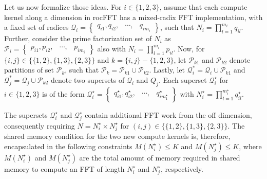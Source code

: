 \documentclass[11pt, onecolumn, journal,compsoc]{IEEEtran}
\theoremstyle{problemstyle}
\begin{document}
Let us now formalize those ideas. For $i \in \{1,2,3\}$, assume that each compute kernel along a dimension in rocFFT has a mixed-radix FFT implementation, with a fixed set of radices $\mathcal{Q}_i=\begin{Bmatrix} q_{i1}, q_{i2}, & \cdots, & q_{im_i} \end{Bmatrix}$, such that $N_i = \prod_{l=1}^{m_i} q_{il}$. Further, consider the prime factorization set of $N_i$ as $\mathcal{P}_i=\begin{Bmatrix} p_{i1}, p_{i2}, & \cdots, & p_{im_i} \end{Bmatrix}$ also with $N_i = \prod_{l=1}^{m_i} p_{il}$. Now, for $\{i,j\} \in \bigl \{ \{1,2\}, \{1,3\}, \{2,3\} \bigr \}$ and $k = \{i,j\} - \{1,2,3\}$, let $\mathcal{P}_{k1}$ and $\mathcal{P}_{k2}$ denote partitions of set $\mathcal{P}_k$, such that $\mathcal{P}_k = \mathcal{P}_{k1} \cup \mathcal{P}_{k2}$. Lastly, let $\mathcal{Q}_i^* = \mathcal{Q}_i \cup \mathcal{P}_{k1}$ and $\mathcal{Q}_j^* = \mathcal{Q}_j \cup \mathcal{P}_{k2}$ denote two supersets of $\mathcal{Q}_i$ and $Q_j$. Each superset $\mathcal{Q}_i^\star$ for $i \in \{1,2,3\}$ is of the form $\mathcal{Q}^{\star}_i=\begin{Bmatrix} q_{i1}^{\star}, q_{i2}^{\star}, & \cdots, & q_{im^{\star}_1}^{\star} \end{Bmatrix}$ with $N_i^\star = \prod_{l=1}^{m_i^\star} q_{il}^\star$. 

The supersets $\mathcal{Q}_i^\star$ and $\mathcal{Q}_j^\star$ contain additional FFT work from the off dimension, consequently requiring $N = N^\star_i \times N^\star_j$ for $(i,j) \in \bigl \{ \{1,2\}, \{1,3\}, \{2,3\} \bigr \}$. The shared memory condition for the two new compute kernels is, therefore, encapsulated in the following constraints $M(N^\star_i) \leq K$  and $M( N^\star_j) \leq K$, where $M(N^\star_i)$ and $M( N^\star_j)$ are the total amount of memory required in shared memory to compute an FFT of length $N^\star_i$ and $N^\star_j$, respectively. 
\end{document}
